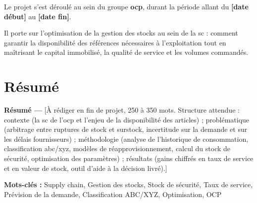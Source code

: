 \documentclass[12pt, a4paper, oneside]{report}
\begin{document}
Le projet s'est déroulé au sein du groupe \textbf{\gls{ocp}}, durant la période allant du \textbf{[date début]} au \textbf{[date fin]}.

Il porte sur l'optimisation de la gestion des stocks au sein de la \gls{sc} : comment garantir la disponibilité des références nécessaires à l'exploitation tout en maîtrisant le capital immobilisé, la qualité de service et les volumes commandés.

\vfill


\chapter*{Résumé}

\begin{tcolorbox}[colback=iacsLight!30, colframe=iacsPrimary, boxrule=0.5pt, arc=3pt]
  \textbf{Résumé ---}
  [À rédiger en fin de projet, 250 à 350 mots. Structure attendue : contexte
  (la \gls{sc} de l'\gls{ocp} et l'enjeu de la disponibilité des articles) ;
  problématique (arbitrage entre ruptures de stock et surstock, incertitude sur
  la demande et sur les délais fournisseurs) ; méthodologie (analyse de
  l'historique de consommation, classification \gls{abc}/\gls{xyz}, modèles de
  réapprovisionnement, calcul du stock de sécurité, optimisation des paramètres) ;
  résultats (gains chiffrés en taux de service et en valeur de stock, outil
  d'aide à la décision livré).]

  \vspace{6pt}
  \textbf{Mots-clés :} Supply chain, Gestion des stocks, Stock de sécurité,
  Taux de service, Prévision de la demande, Classification ABC/XYZ, Optimisation, OCP
\end{tcolorbox}

\vspace{1cm}


%
%
\end{document}
